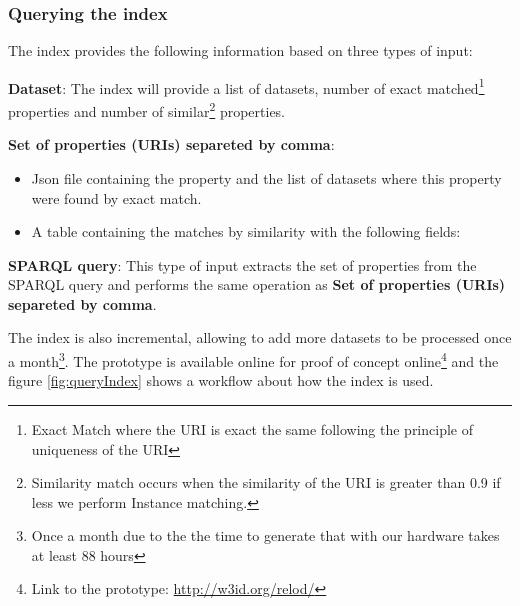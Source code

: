 \subsubsection{Querying the index}

The index provides the following information based on three types of input:
\begin{description}
    \item \textbf{Dataset}: The index will provide a list of datasets, number of exact matched\footnote{Exact Match where the URI is exact the same following the principle of uniqueness of the URI} properties and number of similar\footnote{Similarity match occurs when the similarity of the URI is greater than 0.9 if less we perform Instance matching.} properties.
    \item \textbf{Set of properties (URIs) separeted by comma}: 
    \begin{itemize}
        \item Json file containing the property and the list of datasets where this property were found by exact match.
        \item A table containing the matches by similarity with the following fields:
    \end{itemize}
    \item \textbf{SPARQL query}: This type of input extracts the set of properties from the SPARQL query and performs the same operation as \textbf{Set of properties (URIs) separeted by comma}.
\end{description}

The index is also incremental, allowing to add more datasets to be processed once a month\footnote{Once a month due to the the time to generate that with our hardware takes at least 88 hours}.
The prototype is available online for proof of concept online\footnote{Link to the prototype: \url{http://w3id.org/relod/}} and the figure \ref{fig:queryIndex} shows a workflow about how the index is used.




